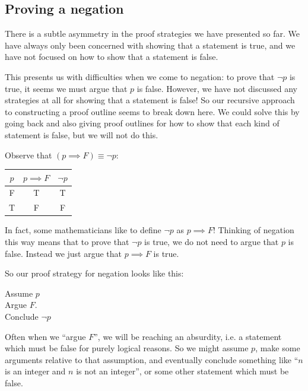 \subsection{Proving a negation}

There is a subtle asymmetry in the proof strategies we have presented so far.  We have always only been concerned with showing that a statement is true, and we have not focused on how to show that a statement is false.

This presents us with difficulties when we come to negation:  to prove that $\neg p$ is true, it seems we must argue that $p$ is false.  However, we have not discussed any strategies at all for showing that a statement is false!  So our recursive approach to constructing a proof outline seems to break down here.  We could solve this by going back and also giving proof outlines for how to show that each kind of statement is false, but we will not do this.

Observe that $(p \implies F) \equiv \neg p$:

\begin{table}[h]
	\centering
	\begin{tabular}{c|c|c}
		$p$ & $p \implies F$ & $\neg p$ 	\\ \hline
		F & T & T 	\\ \hline
		T & F & F
	\end{tabular}
\end{table}

In fact, some mathematicians like to define $\neg p$ as $p \implies F$!    Thinking of negation this way means that to prove that $\neg p$ is true, we do not need to argue that $p$ is false.  Instead we just argue that $p \implies F$ is true.

So our proof strategy for negation looks like this:

\begin{fitch*}
	\textrm{Assume $p$}\\
	\fa \textrm{Argue $F$.}\\
	\textrm{Conclude $\neg p$}
	\end{fitch*}

Often when we ``argue $F$'', we will be reaching an \textrm{absurdity}, i.e. a statement which must be false for purely logical reasons.  So we might assume $p$, make some arguments relative to that assumption, and eventually conclude something like ``$n$ is an integer and $n$ is not an integer'', or some other statement which must be false.

 
\newpage

